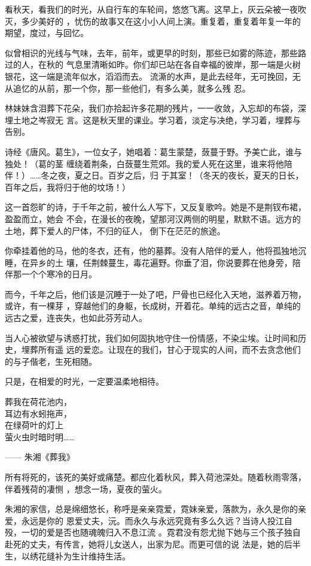 \documentclass[12pt,a4paper]{article}
\begin{document}
		看秋天，看我们的时光，从自行车的车轮间，悠悠飞离。这早上，灰云朵被一夜吹灭，多少美好的
	，忧伤的故事又在这小小人间上演。重复着，重复着年复一年的期望，度过，与回忆。

		似曾相识的光线与气味，去年，前年，或更早的时刻，那些已如雾的陈迹，那些路过的人，在秋的
	气息里清晰如昨。你们却已站在各自幸福的彼岸，那一端是火树银花，这一端是流年似水，滔滔而去。
	流澌的水声，是此去经年，无可挽回，无从追忆的从前，那一个你，那一些他们，有多么美，就多么残
	忍。

		林妹妹含泪葬下花朵，我们亦拾起许多花期的残片，一一收敛，入忘却的布袋，深埋土地之岑寂无
	言。这是秋天里的课业。学习着，淡定与决绝，学习着，埋葬与告别。

		诗经《唐风。葛生》，一位女子，她唱着：葛生蒙楚，蔹蔓于野。予美亡此，谁与独处！（葛的茎
	缠绕着荆条，白蔹蔓生荒郊。我的爱人死在这里，谁来将他陪伴！）……冬之夜，夏之日。百岁之后，归
	于其室！（冬天的夜长，夏天的日长，百年之后，我将归于他的坟场！）

		这一首怨旷的诗，于千年之前，被什么人写下，又反复歌吟。她是不是荆钗布裙，盈盈而立，她会
	不会，在漫长的夜晚，望那河汉两侧的明星，默默不语。远方的土地，葬下爱人的尸体，不归的征人，
	倒下在茫茫的旅途。

		你牵挂着他的马，他的冬衣，还有，他的墓葬。没有人陪伴的爱人，他将孤独地沉睡，在异乡的土
	壤，任荆棘蔓生，毒花遍野。你垂了泪，你说要葬在他身旁，陪伴那一个个寒冷的日月。

		而今，千年之后，他们该是沉睡于一处了吧，尸骨也已经化入天地，滋养着万物，或许，有一棵芽
	，穿越他们的身躯，长成树，开着花。单纯的远古之音，单纯的远古之爱，连丧失，也如此芬芳动人。

		当人心被欲望与诱惑打扰，我们如何固执地守住一份情感，不染尘埃。让时间和历史，埋葬所有遥
	远的爱恋。让现在的我们，甘心于现实的人间，而不去贪念他们的与子偕老，生死相随。

		只是，在相爱的时光，一定要温柔地相待。

		\longpoem{}{}{}

		葬我在荷花池内，\\
		耳边有水蚓拖声，\\
		在绿荷叶的灯上 \\
		萤火虫时暗时明……

		—— 朱湘《葬我》
		\endlongpoem


		所有将死的，该死的美好或痛楚。都应化着秋风，葬入荷池深处。随着秋雨零落，伴着残荷的凄恻
	，想念一场，夏夜的萤火。

		朱湘的家信，总是绵细悠长，称呼是亲亲霓爱，霓妹亲爱，落款为，永久是你的亲爱，永远是你的
	恩爱丈夫，沅。而永久与永远究竟有多么久远？当诗人投江自殁，一切的爱是否也随魂魄归入不息江流
	。霓君没有怨尤抛下她与三个孩子独自赴死的丈夫，有传言，她将儿女送人，出家为尼。而更可信的说
	法是，她的后半生，以绣花缝补为生计维持生活。
\end{document}
